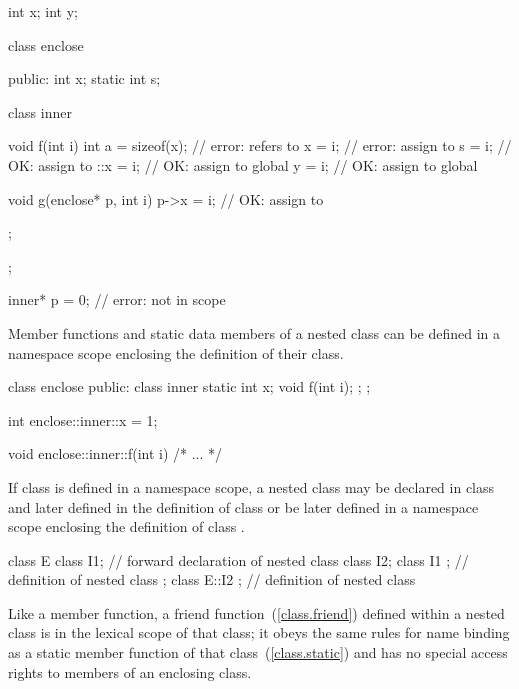 \begin{codeblock}
int x;
int y;

class enclose {
public:
    int x;
    static int s;

    class inner {

	void f(int i)
	{
	    int a = sizeof(x);  // error: refers to 
	    x = i;              // error: assign to 
	    s = i;              // OK: assign to 
	    ::x = i;            // OK: assign to global 
	    y = i;              // OK: assign to global 
	}

	void g(enclose* p, int i)
	{
	    p->x = i;           // OK: assign to 
	}

    };
};

inner* p = 0;                   // error:  not in scope
\end{codeblock}
\exitexampleb

\pnum
Member functions and static data members of a nested class can be
defined in a namespace scope enclosing the definition of their class.
%
\enterexample

\begin{codeblock}
class enclose {
public:
    class inner {
	static int x;
	void f(int i);
    };
};

int enclose::inner::x = 1;

void enclose::inner::f(int i) { /* ... */ }
\end{codeblock}
\exitexampleb

\pnum
If class  is defined in a namespace scope, a nested class
 may be declared in class  and later defined in the
definition of class  or be later defined in a namespace scope
enclosing the definition of class .
%
\enterexample

\begin{codeblock}
class E {
    class I1;                   // forward declaration of nested class
    class I2;
    class I1 {};		// definition of nested class
};
class E::I2 {};			// definition of nested class
\end{codeblock}
\exitexampleb

\pnum
{}%
Like a member function, a friend function~(\ref{class.friend}) defined
within a nested class is in the lexical scope of that class; it obeys
the same rules for name binding as a static member function of that
class~(\ref{class.static}) and has no special access rights to
members of an enclosing class.

